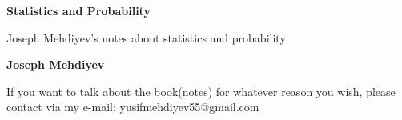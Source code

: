 \begin{titlepage}
    \begin{center}
        \vspace*{1cm}
        \Huge
        \textbf{Statistics and Probability}
        
        \vspace*{0.5cm}
        \LARGE
        Joseph Mehdiyev's notes about statistics and probability

        \vspace*{1.5cm}

        \textbf{Joseph Mehdiyev}

        \vfill
        
        \small
        If you want to talk about the book(notes) for whatever reason you wish, please contact via my e-mail: yusifmehdiyev55@gmail.com
    \end{center}
\end{titlepage}
